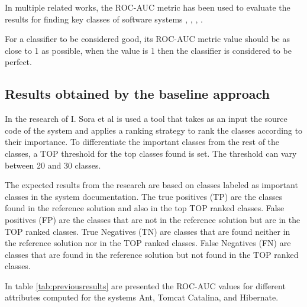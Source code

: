 \documentclass[12pt]{mitthesis}
\begin{document}
In multiple related works, the ROC-AUC metric has been used to evaluate the results for finding key classes of software systems \cite{6676885}, \cite{Finding-key-classes}, \cite{rocclasification}, \cite{7551990}.

For a classifier to be considered good, its ROC-AUC metric value should be as close to 1 as possible, when the value is 1 then the classifier is considered to be perfect.

\subsection{Results obtained by the baseline approach}
\label{sec:previous_measurements}

In the research of I. Sora et al \cite{Finding-key-classes} is used a tool that takes as an input the source code of the system and applies a ranking strategy to rank the classes according to their importance. To differentiate the important classes from the rest of the classes, a TOP threshold for the top classes found is set. The threshold can vary between 20 and 30 classes.

The expected results from the research are based on classes labeled as important classes in the system documentation.
The true positives (TP) are the classes found in the reference solution and also in the top TOP ranked classes. False positives (FP) are the classes that are not in the reference solution but are in the TOP ranked classes.
True Negatives (TN) are classes that are found neither in the reference solution nor in the TOP ranked classes. False Negatives (FN) are classes that are found in the reference solution but not found in the TOP ranked classes.

In table \ref{tab:previousresults} are presented the ROC-AUC values for different attributes computed for the systems Ant, Tomcat Catalina, and Hibernate.

\begin{table}[!h]
\renewcommand{\arraystretch}{1}
\caption{ROC-AUC metric values extracted. }
\label{tab:previousresults}
\centering
{}
\end{table}
\end{document}
